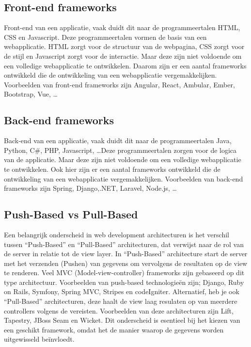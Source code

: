 \documentclass{hogent-article}
\begin{document}
\subsection{Front-end frameworks}%
\label{sub:frontend_frameworks}
Front-end van een applicatie, vaak duidt dit naar de programmeertalen HTML, CSS en Javascript. Deze programmeertalen vormen de basis van een webapplicatie. HTML zorgt voor de structuur van de webpagina, CSS zorgt voor de stijl en Javascript zorgt voor de interactie. Maar deze zijn niet voldoende om een volledige webapplicatie te ontwikkelen. Daarom zijn er een aantal frameworks ontwikkeld die de ontwikkeling van een webapplicatie vergemakkelijken. 
Voorbeelden van front-end frameworks zijn Angular, React, Ambular, Ember, Bootstrap, Vue, \ldots\textcite{Jaiswal2022} 

\subsection{Back-end frameworks}%
\label{sub:backend_frameworks}
Back-end van een applicatie, vaak duidt dit naar de programmeertalen Java, Python, C\#, PHP, Javascript, \ldots Deze programmeertalen zorgen voor de logica van de applicatie. Maar deze zijn niet voldoende om een volledige webapplicatie te ontwikkelen. Ook hier zijn er een aantal frameworks ontwikkeld die de ontwikkeling van een webapplicatie vergemakkelijken.
Voorbeelden van back-end frameworks zijn Spring, Django,.NET, Laravel, Node.js, \ldots\textcite{Kaluza2019}

\subsection{Push-Based vs Pull-Based}%
Een belangrijk onderscheid in web development architecturen is het verschil tussen ``Push-Based'' en ``Pull-Based'' architecturen, dat verwijst naar de rol van de server in relatie tot de view layer.\textcite{Lomas2022}
\bigskip
In ``Push-Based'' architecture start de server met het verzenden (Pushen) van gegevens om vervolgens de resultaten op de view te renderen. Veel MVC (Model-view-controller) frameworks zijn gebaseerd op dit type architectuur. Voorbeelden van push-based technologieën zijn; Django, Ruby on Rails, Symfony, Spring MVC, Stripes en codeIgniter.
\bigskip
Alternatief, heb je ook ``Pull-Based'' architecturen, deze haalt de view laag resulaten op van meerdere controllers volgens de vereisten. Voorbeelden van deze architecturen zijn Lift, Tapestry, JBoss Seam en Wicket.
\bigskip
Dit onderscheid is esentieel bij het kiezen van een geschikt framework, omdat het de manier waarop de gegevens worden uitgewisseld beïnvloedt.
\end{document}
